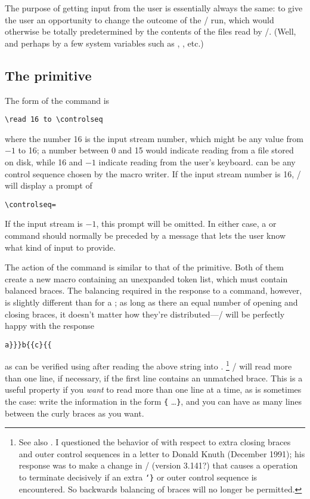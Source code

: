 {The purpose of getting input from the user is essentially always the
same: to give the user an opportunity to change the outcome of the \tex/
run, which would otherwise be totally predetermined by the contents of
the files read by \tex/. (Well, and perhaps by a few system variables
such as , , etc.)

\subsection{The  primitive}\label{ss:readprim}
The form of the  command is
 \begin{verbatim}
\read 16 to \controlseq
\end{verbatim}
where the number 16 is the input stream number,
which might be any value from $-1$ to 16;
a number between 0 and 15 would indicate reading from a file
stored on disk, while 16 and $-1$ indicate reading from the user's
keyboard.  can be any control sequence
chosen by the macro writer. If the input stream number is
16, \tex/ will display a prompt of
 \begin{verbatim}
\controlseq=
\end{verbatim}
If the input stream is $-1$, this prompt will be omitted.  In either
case, a  or  command should normally be
preceded by a message that lets the user know what kind of input to
provide.

The action of the  command is similar to that
of the  primitive. Both of them create a new
macro containing an unexpanded token list, which
must contain balanced braces. The balancing required
in the response to a  command, however,
is slightly different than for a ; as long
as there an equal number of opening and closing
braces, it doesn't matter how they're distributed---\tex/
will be perfectly happy with the response
 \begin{verbatim}
a}}}b{{c}{{
\end{verbatim}
 as can be verified using  after reading the
above string into .%
\footnote{See also .
I questioned the behavior of  with respect to extra closing
braces and outer control sequences in a letter to
Donald Knuth (December 1991);
his response was to make a change in \tex/ (version 3.141?)
that causes a  operation to terminate decisively if an extra
{\tt\char`\}} or outer control sequence is encountered. So backwards
balancing of braces will no longer be permitted.}
\tex/ will read more than one line, if
necessary, if the first line contains an unmatched brace. This is a
useful property if you {\em want\/} to read more than one line at a
time, as is sometimes the case: write the information in the form
\verb|{| \ldots \verb|}|, and you can have as many lines
between the curly braces as you want.

}
